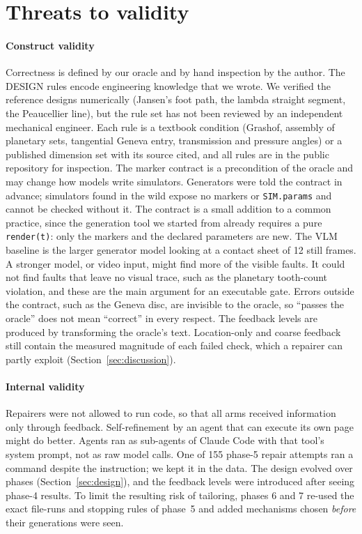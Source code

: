 \section{Threats to validity}\label{sec:threats}

\paragraph{Construct validity} Correctness is defined by our oracle and by hand inspection by the author. The DESIGN rules encode engineering knowledge that we wrote. We verified the reference designs numerically (Jansen's foot path, the lambda straight segment, the Peaucellier line), but the rule set has not been reviewed by an independent mechanical engineer. Each rule is a textbook condition (Grashof, assembly of planetary sets, tangential Geneva entry, transmission and pressure angles) or a published dimension set with its source cited, and all rules are in the public repository for inspection. The marker contract is a precondition of the oracle and may change how models write simulators. Generators were told the contract in advance; simulators found in the wild expose no markers or \texttt{SIM.params} and cannot be checked without it. The contract is a small addition to a common practice, since the generation tool we started from already requires a pure \texttt{render(t)}: only the markers and the declared parameters are new. The VLM baseline is the larger generator model looking at a contact sheet of 12 still frames. A stronger model, or video input, might find more of the visible faults. It could not find faults that leave no visual trace, such as the planetary tooth-count violation, and these are the main argument for an executable gate. Errors outside the contract, such as the Geneva disc, are invisible to the oracle, so ``passes the oracle'' does not mean ``correct'' in every respect. The feedback levels are produced by transforming the oracle's text. Location-only and coarse feedback still contain the measured magnitude of each failed check, which a repairer can partly exploit (Section~\ref{sec:discussion}).

\paragraph{Internal validity} Repairers were not allowed to run code, so that all arms received information only through feedback. Self-refinement by an agent that can execute its own page might do better. Agents ran as sub-agents of Claude Code with that tool's system prompt, not as raw model calls. One of 155 phase-5 repair attempts ran a command despite the instruction; we kept it in the data. The design evolved over phases (Section~\ref{sec:design}), and the feedback levels were introduced after seeing phase-4 results. To limit the resulting risk of tailoring, phases 6 and 7 re-used the exact file-runs and stopping rules of phase~5 and added mechanisms chosen \emph{before} their generations were seen.

